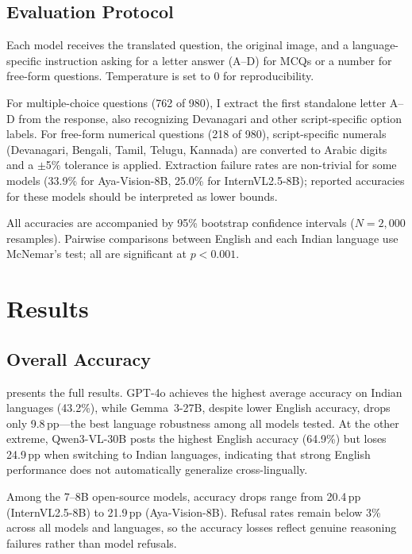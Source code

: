 \documentclass[11pt,a4paper]{article}
\newcommand{\pp}{\,\text{pp}}
\begin{document}
\subsection{Evaluation Protocol}

Each model receives the translated question, the original image, and a language-specific instruction asking for a letter answer (A--D) for MCQs or a number for free-form questions.
Temperature is set to 0 for reproducibility.

For multiple-choice questions (762 of 980), I extract the first standalone letter A--D from the response, also recognizing Devanagari and other script-specific option labels.
For free-form numerical questions (218 of 980), script-specific numerals (Devanagari, Bengali, Tamil, Telugu, Kannada) are converted to Arabic digits and a $\pm$5\% tolerance is applied.
Extraction failure rates are non-trivial for some models (33.9\% for Aya-Vision-8B, 25.0\% for InternVL2.5-8B); reported accuracies for these models should be interpreted as lower bounds.

All accuracies are accompanied by 95\% bootstrap confidence intervals ($N{=}2{,}000$ resamples).
Pairwise comparisons between English and each Indian language use McNemar's test; all are significant at $p < 0.001$.


\section{Results}
\label{sec:results}

\subsection{Overall Accuracy}

 presents the full results.
GPT-4o achieves the highest average accuracy on Indian languages (43.2\%), while Gemma~3-27B, despite lower English accuracy, drops only 9.8$\pp$---the best language robustness among all models tested.
At the other extreme, Qwen3-VL-30B posts the highest English accuracy (64.9\%) but loses 24.9$\pp$ when switching to Indian languages, indicating that strong English performance does not automatically generalize cross-lingually.

Among the 7--8B open-source models, accuracy drops range from 20.4$\pp$ (InternVL2.5-8B) to 21.9$\pp$ (Aya-Vision-8B).
Refusal rates remain below 3\% across all models and languages, so the accuracy losses reflect genuine reasoning failures rather than model refusals.
\end{document}
